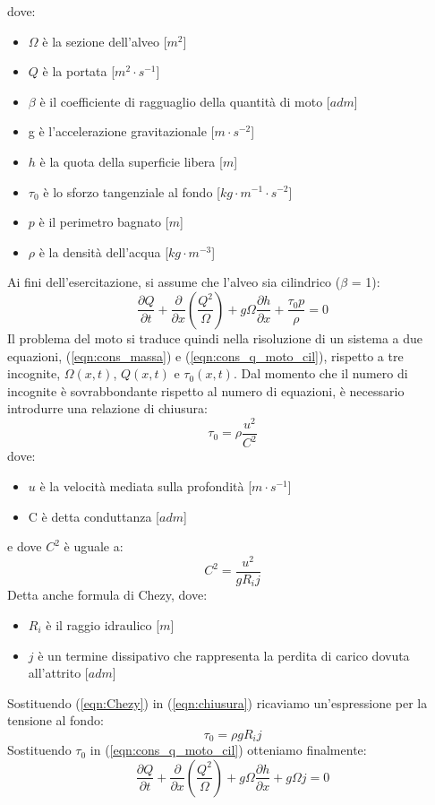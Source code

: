\documentclass[12pt]{article} %
\begin{document}
\noindent dove:
\begin{itemize}
    \item $\Omega$ è la sezione dell'alveo [$m^2$]
     \item $Q$ è la portata [$m^{2}\cdot s^{-1}$]
    \item $\beta$ è il coefficiente di ragguaglio della quantità di moto [$adm$]
    \item g è l'accelerazione gravitazionale [$m\cdot s^{-2}$]
    \item $h$ è la quota della superficie libera [$m$]
    \item $\tau_0$ è lo sforzo tangenziale al fondo [$kg\cdot m^{-1}\cdot s^{-2}$]
    \item $p$ è il perimetro bagnato [$m$]
    \item $\rho$ è la densità dell’acqua [$kg\cdot m^{-3}$]
\end{itemize}
\noindent Ai fini dell'esercitazione, si assume che l'alveo sia cilindrico ($\beta$ = 1):
\begin{equation}
    \frac{\partial Q }{\partial t}+\frac{\partial}{\partial x}\left(\frac{Q^2}{\Omega}\right)+g\Omega\frac{\partial h}{\partial x}+\frac{\tau_0p}{\rho}=0
    \label{eqn:cons_q_moto_cil}
\end{equation}
\noindent Il problema del moto si traduce quindi nella risoluzione di un sistema a due equazioni, (\ref{eqn:cons_massa}) e (\ref{eqn:cons_q_moto_cil}), rispetto a tre incognite, $\Omega(x,t)$, $Q(x,t)$ e $\tau_0(x,t)$. Dal momento che il numero di incognite è sovrabbondante rispetto al numero di equazioni, è necessario introdurre una relazione di chiusura:
\begin{equation}
    \tau_0 = \rho\frac{u^{2}}{C^{2}}
    \label{eqn:chiusura}
\end{equation}
dove:
\begin{itemize}
\item $u$ è la velocità mediata sulla profondità [$m\cdot s^{-1}$]
\item C è detta conduttanza [$adm$]
\end{itemize}
e dove $C^2$ è uguale a:  
\begin{equation}
    C^2=\frac{u^2}{gR_ij}
    \label{eqn:Chezy}
\end{equation}
\noindent Detta anche formula di Chezy, dove:
\begin{itemize}
    \item $R_i$ è il raggio idraulico [$m$]
    \item $j$ è un termine dissipativo che rappresenta la perdita di carico dovuta all'attrito [$adm$]
\end{itemize}
\noindent Sostituendo (\ref{eqn:Chezy}) in (\ref{eqn:chiusura}) ricaviamo un'espressione per la tensione al fondo:
\begin{equation}
    \tau_0=\rho gR_ij
    \label{eqn:tensione_fondo}
\end{equation}
\noindent Sostituendo $\tau_0$ in (\ref{eqn:cons_q_moto_cil}) otteniamo finalmente:
\begin{equation}
    \frac{\partial Q }{\partial t}+\frac{\partial}{\partial x}\left(\frac{Q^2}{\Omega}\right)+g\Omega\frac{\partial h}{\partial x}+{g\Omega j}=0
    \label{eqn:cons_q_moto_chius}
\end{equation}
\end{document}
